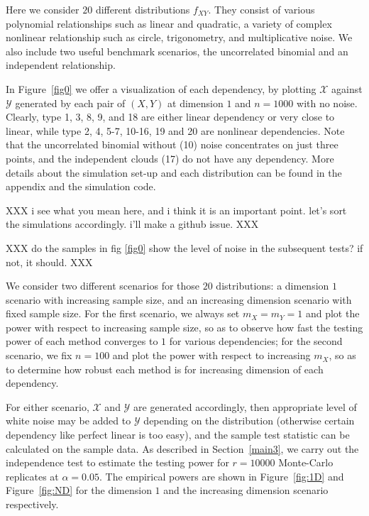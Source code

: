 \documentclass[11pt]{article}
\begin{document}
Here we consider $20$ different distributions $f_{XY}$. They consist of various polynomial relationships such as linear and quadratic, a variety of complex nonlinear relationship such as circle, trigonometry, and multiplicative noise. We also include two useful benchmark scenarios, the uncorrelated binomial and an independent relationship. 

In Figure~\ref{fig0} we offer a visualization of each dependency, by plotting $\mathcal{X}$ against $\mathcal{Y}$ generated by each pair of $(X,Y)$ at dimension $1$ and $n=1000$ with no noise. Clearly, type 1, 3, 8, 9, and 18 are either linear dependency or very close to linear, while type 2, 4, 5-7, 10-16, 19 and 20 are nonlinear dependencies. Note that the uncorrelated binomial without (10) noise concentrates on just three points, and the independent clouds (17) do not have any dependency. More details about the simulation set-up and each distribution can be found in the appendix and the simulation code.

XXX i see what you mean here, and i think it is an important point.  let's sort the simulations accordingly.  i'll make a github issue. XXX

XXX do the samples in fig \ref{fig0} show the level of noise in the subsequent tests? if not, it should. XXX


We consider two different scenarios for those $20$ distributions: a dimension $1$ scenario with increasing sample size, and an increasing dimension scenario with fixed sample size. For the first scenario, we always set $m_{X}=m_{Y}=1$ and plot the power with respect to increasing sample size, so as to observe how fast the testing power of each method converges to $1$ for various dependencies; for the second scenario, we fix $n=100$ and plot the power with respect to increasing $m_{X}$, so as to determine how robust each method is for increasing dimension of each dependency. 

For either scenario, $\mathcal{X}$ and $\mathcal{Y}$ are generated accordingly, then appropriate level of white noise may be added to $\mathcal{Y}$ depending on the distribution (otherwise certain dependency like perfect linear is too easy), and the sample test statistic can be calculated on the sample data. As described in Section~\ref{main3}, we carry out the independence test to estimate the testing power for $r=10000$ Monte-Carlo replicates at $\alpha=0.05$. The empirical powers are shown in Figure~\ref{fig:1D} and Figure~\ref{fig:ND} for the dimension $1$ and the increasing dimension scenario respectively. 
\end{document}
